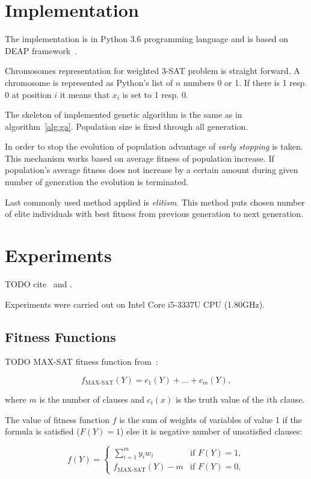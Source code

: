 \documentclass{article}
\begin{document}
\section{Implementation}

The implementation is in Python 3.6 programming language
and is based on DEAP framework~\cite{fortin2012}.

Chromosomes representation for weighted 3-SAT problem is straight forward.
A chromosome is represented as Python's list of $n$ numbers 0 or 1.
If there is 1 resp. 0 at position $i$ it means that $x_i$ is set to 1 resp. 0.

The skeleton of implemented genetic algorithm is the same as
in algorithm~\ref{alg:ga}.
Population size is fixed through all generation.

In order to stop the evolution of population advantage of
\textit{early stopping} is taken.
This mechanism works based on average fitness of population increase.
If population's average fitness does not increase by a certain amount
during given number of generation the evolution is terminated.

Last commonly used method applied is \textit{elitism}.
This method puts chosen number of elite individuals with best fitness
from previous generation to next generation.

\section{Experiments}

TODO cite~\cite{gottlieb2002} and \cite{ellerweg2004}.

Experiments were carried out on Intel Core i5-3337U CPU (1.80GHz).

\subsection{Fitness Functions}

TODO MAX-SAT fitness function from~\cite{dejong1989}:

$$f_{\text{MAX-SAT}}(Y) = c_1(Y) + \dots + c_m(Y),$$

where $m$ is the number of clauses and $c_i(x)$ is the truth value of the $i$th
clause.

The value of fitness function $f$ is the sum of weights of variables of value 1
if the formula is satisfied ($F(Y) = 1$)
else it is negative number of unsatisfied clauses:

$$
f(Y) = 
\begin{cases} 
    \sum_{i = 1}^m y_i w_i & \text{if } F(Y) = 1, \\
    f_{\text{MAX-SAT}}(Y) - m & \text{if } F(Y) = 0,
\end{cases}
$$
\end{document}
